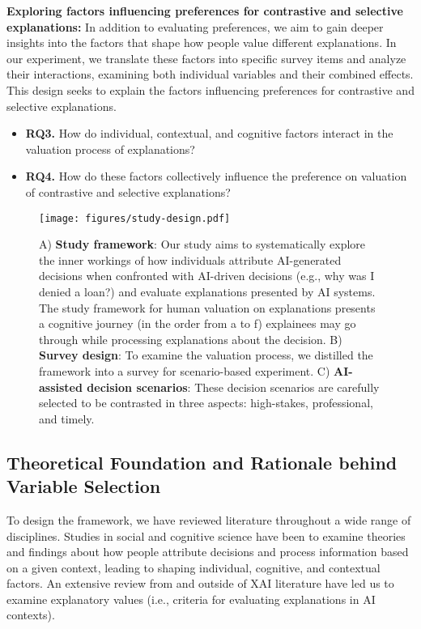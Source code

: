 {\bf Exploring factors influencing preferences for contrastive and selective explanations:} In addition to evaluating preferences, we aim to gain deeper insights into the factors that shape how people value different explanations. In our experiment, we translate these factors into specific survey items and analyze their interactions, examining both individual variables and their combined effects. This design seeks to explain the factors influencing preferences for contrastive and selective explanations.

\begin{itemize}
    \item \textbf{RQ3.} How do individual, contextual, and cognitive factors interact in the valuation process of explanations?
    \item \textbf{RQ4.} How do these factors collectively influence the preference on valuation of contrastive and selective explanations?
\end{itemize}

\begin{figure*}[h]%
\centering
\texttt{[image: figures/study-design.pdf]}
\caption{A) \textbf{Study framework}: Our study aims to systematically explore the inner workings of how individuals attribute AI-generated decisions when confronted with AI-driven decisions (e.g., why was I denied a loan?) and evaluate explanations presented by AI systems. The study framework for human valuation on explanations presents a cognitive journey (in the order from a to f) explainees may go through while processing explanations about the decision. B) \textbf{Survey design}: To examine the valuation process, we distilled the framework into a survey for scenario-based experiment. C) \textbf{AI-assisted decision scenarios}: These decision scenarios are carefully selected to be contrasted in three aspects: high-stakes, professional, and timely.}
\label{fig:study-design}
\end{figure*}

\subsection{Theoretical Foundation and Rationale behind Variable Selection} \label{sec:variable-selection}
To design the framework, we have reviewed literature throughout a wide range of disciplines. Studies in social and cognitive science have been to examine theories and findings about how people attribute decisions and process information based on a given context, leading to shaping individual, cognitive, and contextual factors. An extensive review from and outside of XAI literature have led us to examine explanatory values (i.e., criteria for evaluating explanations in AI contexts).

